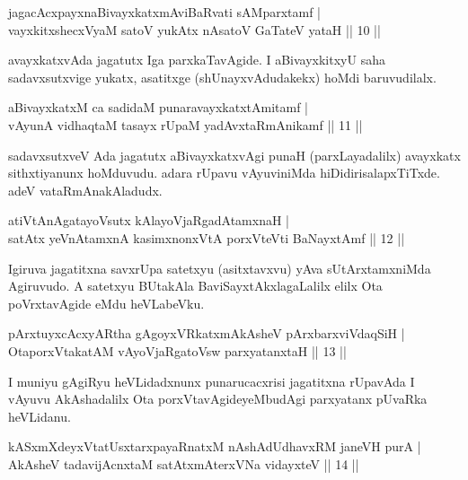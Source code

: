 \begin{shl}
jagacAcxpayxnaBivayxkatxmAviBaRvati sAMparxtamf |\\
vayxkitxshecxVyaM satoV yukAtx nAsatoV GaTateV yataH \hfill || 10 ||
\end{shl}

\begin{artha}%
avayxkatxvAda jagatutx Iga parxkaTavAgide. I aBivayxkitxyU saha sadavxsutxvige yukatx, asatitxge (shUnayxvAdudakekx) hoMdi baruvudilalx.
\end{artha}

\begin{shl}
aBivayxkatxM ca sadidaM punaravayxkatxtAmitamf |\\
vAyunA vidhaqtaM tasayx rUpaM yadAvxtaRmAnikamf \hfill || 11 ||
\end{shl}

\begin{artha}
sadavxsutxveV Ada jagatutx aBivayxkatxvAgi punaH (parxLayadalilx) avayxkatx sithxtiyanunx hoMduvudu. adara rUpavu vAyuviniMda hiDidirisalapxTiTxde. adeV vataRmAnakAladudx. 
\end{artha}


\begin{shl}
atiVtAnAgatayoVsutx kAlayoVjaRgadAtamxnaH |\\
satAtx yeVnA\s \s tamxnA kasimxnonxVtA porxVteVti BaNayxtAmf \hfill || 12 ||
\end{shl}

\begin{artha}
Igiruva jagatitxna savxrUpa satetxyu (asitxtavxvu) yAva sUtArxtamxniMda Agiruvudo. A satetxyu BUtakAla BaviSayxtAkxlagaLalilx elilx Ota poVrxtavAgide eMdu heVLabeVku.
\end{artha}

\begin{shl}
pArxtuyxcAcxyARtha gAgoyxVRkatxmAkAsheV pArxbarxviVdaqSiH |\\
OtaporxVtakatAM vAyoVjaRgatoV\s sw parxyatanxtaH \hfill || 13 ||
\end{shl}

\begin{artha}
I muniyu gAgiRyu heVLidadxnunx punarucacxrisi jagatitxna rUpavAda I vAyuvu AkAshadalilx Ota porxVtavAgideyeMbudAgi parxyatanx pUvaRka heVLidanu.
\end{artha}%

\begin{shl}
kASxmXdeyxVtatUsxtarxpayaRnatxM nAshAdUdhavxRM janeVH purA |\\
AkAsheV tadavijAcnxtaM satAtxmAterxVNa vidayxteV \hfill || 14 ||
\end{shl}

